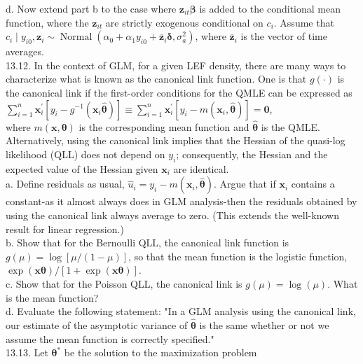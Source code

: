 \documentclass[10pt]{article}
\begin{document}
d. Now extend part b to the case where $\mathbf{z}_{i t} \boldsymbol{\beta}$ is added to the conditional mean function, where the $\mathbf{z}_{i t}$ are strictly exogenous conditional on $c_{i}$. Assume that $c_{i} \mid y_{i 0}, \mathbf{z}_{i} \sim \operatorname{Normal}\left(\alpha_{0}+\alpha_{1} y_{i 0}+\overline{\mathbf{z}}_{i} \boldsymbol{\delta}, \sigma_{a}^{2}\right)$, where $\overline{\mathbf{z}}_{i}$ is the vector of time averages.\\
13.12. In the context of GLM, for a given LEF density, there are many ways to characterize what is known as the canonical link function. One is that $g(\cdot)$ is the canonical link if the first-order conditions for the QMLE can be expressed as\\
$\sum_{i=1}^{n} \mathbf{x}_{i}^{\prime}\left[y_{i}-g^{-1}\left(\mathbf{x}_{i} \hat{\boldsymbol{\theta}}\right)\right] \equiv \sum_{i=1}^{n} \mathbf{x}_{i}^{\prime}\left[y_{i}-m\left(\mathbf{x}_{i}, \hat{\boldsymbol{\theta}}\right)\right]=\mathbf{0}$,\\
where $m(\mathbf{x}, \boldsymbol{\theta})$ is the corresponding mean function and $\hat{\boldsymbol{\theta}}$ is the QMLE. Alternatively, using the canonical link implies that the Hessian of the quasi-log likelihood (QLL) does not depend on $y_{i}$; consequently, the Hessian and the expected value of the Hessian given $\mathbf{x}_{i}$ are identical.\\
a. Define residuals as usual, $\hat{u}_{i}=y_{i}-m\left(\mathbf{x}_{i}, \hat{\boldsymbol{\theta}}\right)$. Argue that if $\mathbf{x}_{i}$ contains a constant-as it almost always does in GLM analysis-then the residuals obtained by using the canonical link always average to zero. (This extends the well-known result for linear regression.)\\
b. Show that for the Bernoulli QLL, the canonical link function is $g(\mu)= \log [\mu /(1-\mu)]$, so that the mean function is the logistic function, $\exp (\mathbf{x} \boldsymbol{\theta}) / [1+\exp (\mathbf{x} \boldsymbol{\theta})]$.\\
c. Show that for the Poisson QLL, the canonical link is $g(\mu)=\log (\mu)$. What is the mean function?\\
d. Evaluate the following statement: "In a GLM analysis using the canonical link, our estimate of the asymptotic variance of $\hat{\boldsymbol{\theta}}$ is the same whether or not we assume the mean function is correctly specified."\\
13.13. Let $\boldsymbol{\theta}^{*}$ be the solution to the maximization problem
\end{document}
